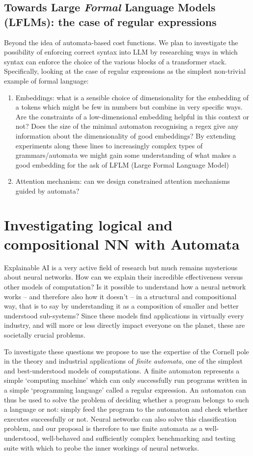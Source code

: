 \documentclass[11pt,a4paper]{article}
\begin{document}
		\subsection{Towards Large \emph{Formal} Language Models (LFLMs): the case of regular expressions}
			Beyond the idea of automata-based cost functions. We plan to investigate the possibility of enforcing correct syntax into LLM by researching ways in which syntax can enforce the choice of the various blocks of a transformer stack. Specifically, looking at the case of regular expressions as the simplest non-trivial example of formal language: 
			\begin{enumerate}
				\item Embeddings: what is a sensible choice of dimensionality for the embedding of a tokens which might be few in numbers but combine in very specific ways. Are the constraints of a low-dimensional embedding helpful in this context or not? Does the size of the minimal automaton recognising a regex give any information about the dimensionality of good embeddings? By extending experiments along these lines to increasingly complex types of grammars/automata we might gain some understanding of what makes a good embedding for the ask of LFLM (Large Formal Language Model)
				\item Attention mechanism: can we design constrained attention mechanisms guided by automata?
			\end{enumerate}
	
	\section{Investigating logical and compositional NN with Automata}
	Explainable AI is a very active field of research but much remains mysterious about neural networks. How can we explain their incredible effectiveness versus other models of computation? Is it possible to understand how a neural network works -- and therefore also how it doesn't -- in a structural and compositional way, that is to say by understanding it as a composition of smaller and better understood sub-systems? Since these models find applications in virtually every industry, and will more or less directly impact everyone on the planet, these are societally crucial problems. 
	
	To investigate these questions we propose to use the expertise of the Cornell pole in the theory and industrial applications of \emph{finite automata}, one of the simplest and best-understood models of computations. A finite automaton represents a simple `computing machine' which can only successfully run programs written in a simple `programming language' called a regular expression. An automaton can thus be used to solve the problem of deciding whether a program belongs to such a language or not: simply feed the program to the automaton and check whether executes successfully or not. Neural networks can also solve this classification problem, and our proposal is therefore to use finite automata as a well-understood, well-behaved and sufficiently complex benchmarking and testing suite with which to probe the inner workings of neural networks. 
	
\end{document}

